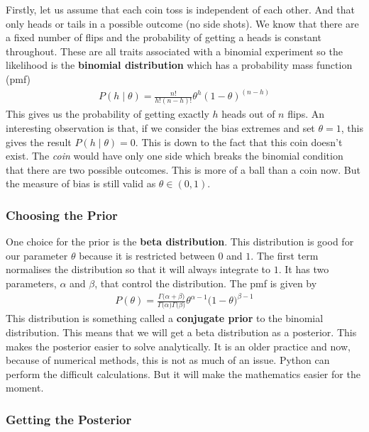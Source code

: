 \documentclass[12pt,twoside]{report}   %
\begin{document}
Firstly, let us assume that each coin toss is independent of each other. And that only heads
or tails in a possible outcome (no side shots). We know that there are a fixed number of flips and the probability of getting a heads is constant throughout. These are all traits associated with a binomial experiment so the likelihood is the \textbf{binomial distribution} which has a probability mass function (pmf)
\begin{align}\label{Binomial Distribution}
P(h\mid\theta) = \frac{n!}{h!(n - h)!}\theta^h(1 - \theta)^{(n-h)}
\end{align}
This gives us the probability of getting exactly $h$ heads out of $n$ flips. An interesting observation is that, if we consider the bias extremes and set $\theta = 1$, this gives the result $P(h\mid\theta) = 0$. This is down to the fact that this coin doesn't exist. The \textit{coin} would have only one side which breaks the binomial condition that there are two possible outcomes. This is more of a ball than a coin now. But the measure of bias is still valid as $\theta \in (0,1)$.

\subsubsection{Choosing the Prior}\label{Choosing the Prior}

One choice for the prior is the \textbf{beta distribution}. This distribution is good for our parameter $\theta$ because it is restricted between $0$ and $1$. The first term normalises the distribution so that it will always integrate to $1$. It has two parameters, $\alpha$ and $\beta$, that control the distribution. The pmf is given by
\begin{align}\label{Beta Distribution}
P(\theta) = \frac{\Gamma\big(\alpha + \beta\big)}{\Gamma\big(\alpha\big)\Gamma\big(\beta\big)}\theta^{\alpha - 1}\big(1 - \theta\big)^{\beta - 1}
\end{align}
This distribution is something called a \textbf{conjugate prior} to the binomial distribution. This means that we will get a beta distribution as a posterior. This makes the posterior easier to solve analytically. It is an older practice and now, because of numerical methods, this is not as much of an issue. Python can perform the difficult calculations. But it will make the mathematics easier for the moment.

\subsubsection{Getting the Posterior}\label{Getting the Posterior}
\end{document}
